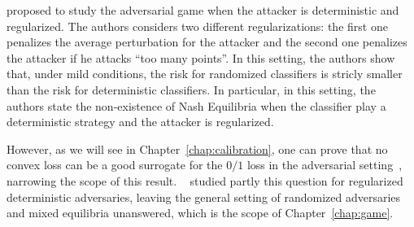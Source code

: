 \cite{pinot2020randomization} proposed to study the adversarial game when the attacker is deterministic and regularized. The authors considers two different regularizations: the first one penalizes the average perturbation for the attacker and the second one penalizes the attacker if he attacks ``too many points''. In this setting,  the authors show that, under mild conditions, the risk for randomized classifiers is stricly smaller than the risk for deterministic classifiers. In particular, in this setting, the authors state the non-existence of Nash Equilibria when the classifier play a deterministic strategy and the attacker is regularized. 

However, as we will see in Chapter~\ref{chap:calibration}, one can prove that no convex loss can be a good surrogate for the $0/1$ loss in the adversarial setting~\citep{pmlr-v125-bao20a,pmlr-v97-cranko19a,xxx}, narrowing the scope of this result. ~\cite{pinot2020randomization} studied partly this question for regularized deterministic adversaries, leaving the general setting of  randomized adversaries and  mixed equilibria unanswered, which is the scope of Chapter~\ref{chap:game}.


